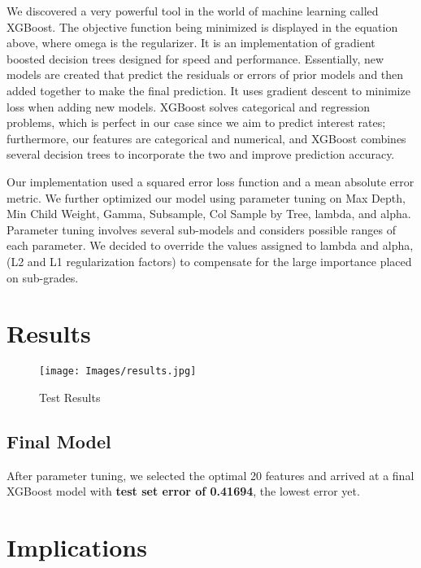 \documentclass[twocolumn]{article}
\begin{document}
\par{\hspace{18}We discovered a very powerful tool in the world of machine learning called XGBoost. The objective function being minimized is displayed in the equation above, where omega is the regularizer. It is an implementation of gradient boosted decision trees designed for speed and performance. Essentially, new models are created that predict the residuals or errors of prior models and then added together to make the final prediction. It uses gradient descent to minimize loss when adding new models. XGBoost solves categorical and regression problems, which is perfect in our case since we aim to predict interest rates; furthermore, our features are categorical and numerical, and XGBoost combines several decision trees to incorporate the two and improve prediction accuracy.}
\par{Our implementation used a squared error loss function and a mean absolute error metric. We further optimized our model using parameter tuning on Max Depth, Min Child Weight, Gamma, Subsample, Col Sample by Tree, lambda, and alpha. Parameter tuning involves several sub-models and considers possible ranges of each parameter. We decided to override the values assigned to lambda and alpha, (L2 and L1 regularization factors) to compensate for the large importance placed on sub-grades.
 }


\section{Results}

\begin{figure}[h!]
\centering
\texttt{[image: Images/results.jpg]}
\caption{Test Results}
\end{figure}

\subsection{Final Model}
\par{\hspace{18}After parameter tuning, we selected the optimal 20 features and arrived at a final XGBoost model with \textbf{test set error of 0.41694}, the lowest error yet.
}

\section{Implications}
\end{document}
